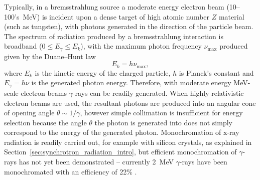 \documentclass[../main.tex]{subfiles}
\begin{document}
Typically, in a bremsstrahlung source a moderate energy electron beam (10--100's~\si{\mega\electronvolt}) is incident upon a dense target of high atomic number $Z$ material (such as tungsten), with photons generated in the direction of the particle beam. The spectrum of radiation produced by a bremsstrahlung interaction is broadband ($0 \leq E_{\gamma} \leq E_{k}$), with the maximum photon frequency $\nu_{\mathrm{max}}$ produced given by the Duane--Hunt law \cite{duane1915xray}
\begin{equation}
E_{k}=h\nu_{\mathrm{max}},
\label{eq:duane_hunt_intro}
\end{equation}
where $E_{k}$ is the kinetic energy of the charged particle, $h$ is Planck's constant and $E_{\gamma}=h\nu$ is the generated photon energy. Therefore, with moderate energy \si{\mega\electronvolt}-scale electron beams $\gamma$-rays can be readily generated. When highly relativistic electron beams are used, the resultant photons are produced into an angular cone of opening angle $\theta\sim 1/\gamma$, however simple collimation is insufficient for energy selection because the angle $\theta$ the photon is generated into does not simply correspond to the energy of the generated photon. Monochromation of x-ray radiation is readily carried out, for example with silicon crystals, as explained in Section~\ref{sec:synchrotron_radiation_intro}, but efficient monochromation of $\gamma$-rays has not yet been demonstrated -- currently 2~\si{\mega\electronvolt} $\gamma$-rays have been monochromated with an efficiency of 22\% \cite{jentschel2012gamma}. 
\end{document}
